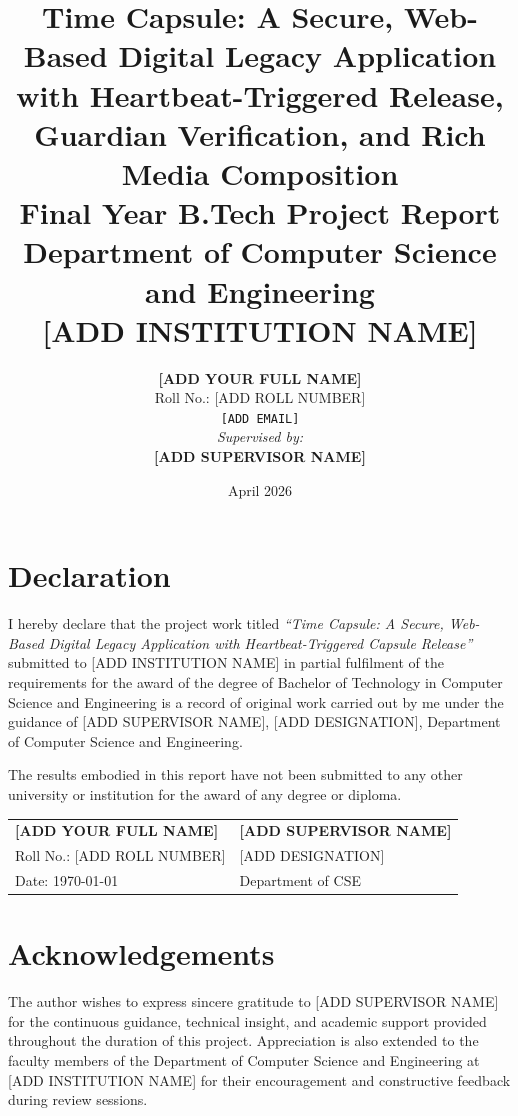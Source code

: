 \documentclass[12pt, a4paper]{article}
\title{
  \vspace{-1cm}
  {\LARGE \textbf{Time Capsule: A Secure, Web-Based Digital Legacy Application\\
  with Heartbeat-Triggered Release, Guardian Verification, and Rich Media Composition}}\\[0.5cm]
  {\large Final Year B.Tech Project Report}\\[0.3cm]
  {\normalsize Department of Computer Science and Engineering}\\
  {\normalsize [ADD INSTITUTION NAME]}
}
\author{
  \textbf{[ADD YOUR FULL NAME]}\\
  Roll No.: [ADD ROLL NUMBER]\\
  \texttt{[ADD EMAIL]}\\[0.3cm]
  \textit{Supervised by:}\\
  \textbf{[ADD SUPERVISOR NAME]}\\
  [ADD SUPERVISOR DESIGNATION]
}
\date{April 2026}
\begin{document}
\maketitle
\thispagestyle{empty}

\newpage
{}

\section*{Declaration}

I hereby declare that the project work titled \textit{``Time Capsule: A Secure, Web-Based Digital Legacy Application with Heartbeat-Triggered Capsule Release''} submitted to [ADD INSTITUTION NAME] in partial fulfilment of the requirements for the award of the degree of Bachelor of Technology in Computer Science and Engineering is a record of original work carried out by me under the guidance of [ADD SUPERVISOR NAME], [ADD DESIGNATION], Department of Computer Science and Engineering.

The results embodied in this report have not been submitted to any other university or institution for the award of any degree or diploma.

\vspace{2cm}

\noindent
\begin{tabular}{p{7cm} p{7cm}}
  \textbf{[ADD YOUR FULL NAME]} & \textbf{[ADD SUPERVISOR NAME]}\\
  Roll No.: [ADD ROLL NUMBER] & [ADD DESIGNATION]\\
  Date: \today & Department of CSE\\
\end{tabular}

\newpage

\section*{Acknowledgements}

The author wishes to express sincere gratitude to [ADD SUPERVISOR NAME] for the continuous guidance, technical insight, and academic support provided throughout the duration of this project. Appreciation is also extended to the faculty members of the Department of Computer Science and Engineering at [ADD INSTITUTION NAME] for their encouragement and constructive feedback during review sessions.
\end{document}
